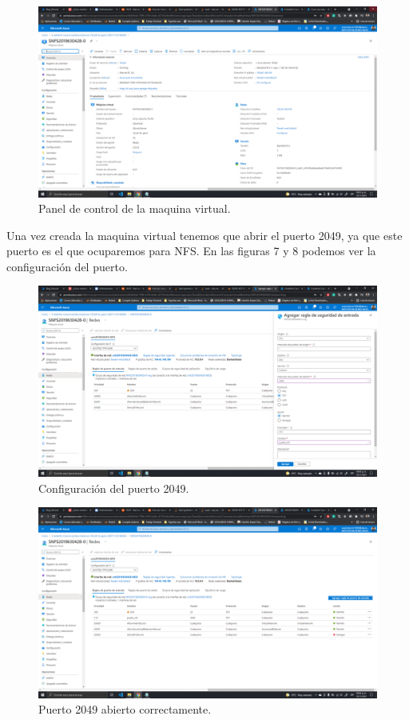 \documentclass[11pt]{article}
\begin{document}
		\begin{figure}[H]
			\centering
			\includegraphics[scale=0.34]{resources/paneldecontrol0.png}
			\caption{Panel de control de la maquina virtual.}\label{fig:picture}
		\end{figure}
		Una vez creada la maquina virtual tenemos que abrir el puerto 2049, ya que este puerto es el que ocuparemos para NFS. En las figuras 7 y 8 podemos ver la configuración del puerto.
		\begin{figure}[H]
			\centering
			\includegraphics[scale=0.34]{resources/open20490.png}
			\caption{Configuración del puerto 2049.}\label{fig:picture}
		\end{figure}
		\begin{figure}[H]
			\centering
			\includegraphics[scale=0.34]{resources/puertook0.png}
			\caption{Puerto 2049 abierto correctamente.}\label{fig:picture}
		\end{figure}
\end{document}
